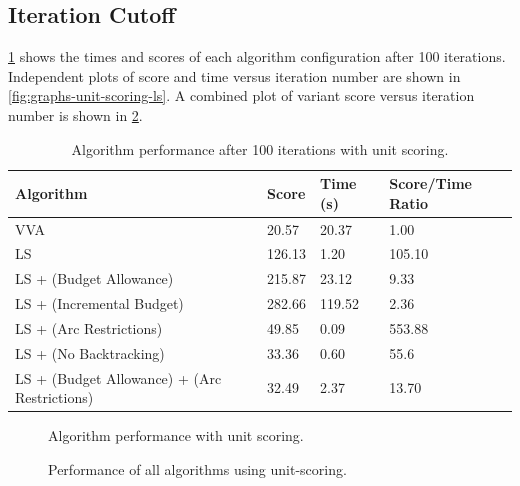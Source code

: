 \documentclass[honors]{union-cs-thesis}
\begin{document}
\subsection{Iteration Cutoff}
\label{sec:iteration-cutoff}
\cref{tab:unit-scoring-results} shows the times and scores of each algorithm configuration after 100 iterations. Independent plots of score and time versus iteration number are shown in \cref{fig:graphs-unit-scoring-ls}. A combined plot of variant score versus iteration number is shown in \cref{fig:graphs-combined-unit-scoring}.

\label{sec:unit-scoring}
\begin{table}
\begin{center}
\begin{tabular}{|l|l|l|l|}
    \hline
    \textbf{Algorithm} & \textbf{Score} & \textbf{Time (s)} & \textbf{Score/Time Ratio} \\
    \hline
    VVA & 20.57 & 20.37 & 1.00 \\
    \hline
    LS & 126.13 & 1.20 & 105.10 \\
    \hline
    LS + (Budget Allowance) & 215.87 & 23.12 & 9.33 \\
    \hline
    LS + (Incremental Budget) & 282.66 & 119.52 & 2.36 \\
    \hline
    LS + (Arc Restrictions) & 49.85 & 0.09 & 553.88 \\
    \hline
    LS + (No Backtracking) & 33.36 & 0.60 & 55.6 \\
    \hline
    LS + (Budget Allowance) + (Arc Restrictions) & 32.49 & 2.37 & 13.70  \\
    \hline
\end{tabular}
\caption{Algorithm performance after 100 iterations with unit scoring.}
\label{tab:unit-scoring-results}
\end{center}
\end{table}

\begin{figure}

\caption{Algorithm performance with unit scoring.}
\label{fig:graphs-unit-scoring}
\end{figure}


\begin{figure}

\caption{Performance of all algorithms using unit-scoring.}
\label{fig:graphs-combined-unit-scoring}
\end{figure}
\end{document}
